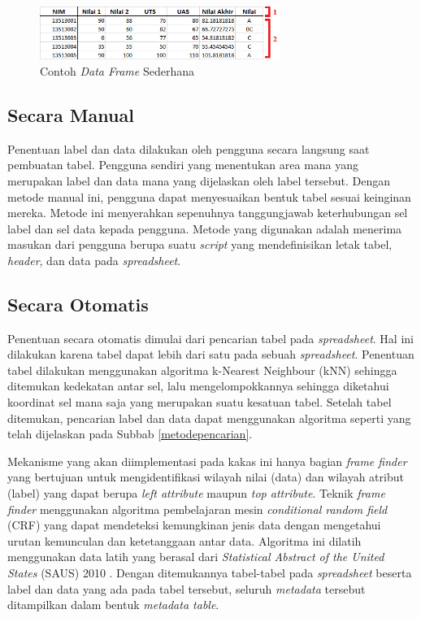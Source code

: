 \begin{figure}[htb]
    \centering
    \includegraphics[width=0.7\textwidth]{resources/chapter-3-simple-dataframe2.png}
    \caption{Contoh \textit{Data Frame} Sederhana}
	\label{DataFrameSederhana}
\end{figure}

	\subsection{Secara Manual}
	Penentuan label dan data dilakukan oleh pengguna secara langsung saat pembuatan tabel. Pengguna sendiri yang menentukan area mana yang merupakan label dan data mana yang dijelaskan oleh label tersebut. Dengan metode manual ini, pengguna dapat menyesuaikan bentuk tabel sesuai keinginan mereka. Metode ini menyerahkan sepenuhnya tanggungjawab keterhubungan sel label dan sel data kepada pengguna. Metode yang digunakan adalah menerima masukan dari pengguna berupa suatu \textit{script} yang mendefinisikan letak tabel, \textit{header}, dan data pada \textit{spreadsheet}.

	\subsection{Secara Otomatis}
	Penentuan secara otomatis dimulai dari pencarian tabel pada \textit{spreadsheet}. Hal ini dilakukan karena tabel dapat lebih dari satu pada sebuah \textit{spreadsheet}. Penentuan tabel dilakukan menggunakan algoritma k-Nearest Neighbour (kNN) sehingga ditemukan kedekatan antar sel, lalu mengelompokkannya sehingga diketahui koordinat sel mana saja yang merupakan suatu kesatuan tabel. Setelah tabel ditemukan, pencarian label dan data dapat menggunakan algoritma seperti yang telah dijelaskan pada Subbab \ref{metodepencarian}. 

	Mekanisme yang akan diimplementasi pada kakas ini hanya bagian \textit{frame finder} yang bertujuan untuk mengidentifikasi wilayah nilai (data) dan wilayah atribut (label) yang dapat berupa \textit{left attribute} maupun \textit{top attribute}. Teknik \textit{frame finder} menggunakan algoritma pembelajaran mesin \textit{conditional random field} (CRF) yang dapat mendeteksi kemungkinan jenis data dengan mengetahui urutan kemunculan dan ketetanggaan antar data. Algoritma ini dilatih menggunakan data latih yang berasal dari \textit{Statistical Abstract of the United States} (SAUS) 2010 \citep{ChenGithub}. Dengan ditemukannya tabel-tabel pada \textit{spreadsheet} beserta label dan data yang ada pada tabel tersebut, seluruh \textit{metadata} tersebut ditampilkan dalam bentuk \textit{metadata table}.


